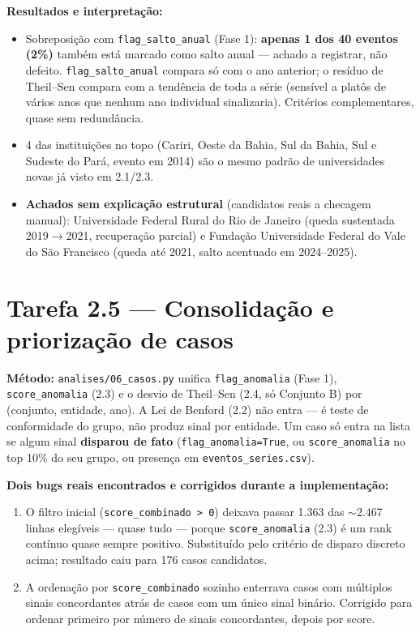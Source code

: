 \documentclass[11pt,a4paper]{article}
\begin{document}
\textbf{Resultados e interpretação:}

\begin{itemize}
    \item Sobreposição com \texttt{flag\_salto\_anual} (Fase 1):
    \textbf{apenas 1 dos 40 eventos (2\%)} também está marcado como salto
    anual --- achado a registrar, não defeito. \texttt{flag\_salto\_anual}
    compara só com o ano anterior; o resíduo de Theil--Sen compara com a
    tendência de toda a série (sensível a platôs de vários anos que nenhum
    ano individual sinalizaria). Critérios complementares, quase sem
    redundância.
    \item 4 das instituições no topo (Cariri, Oeste da Bahia, Sul da
    Bahia, Sul e Sudeste do Pará, evento em 2014) são o mesmo padrão de
    universidades novas já visto em 2.1/2.3.
    \item \textbf{Achados sem explicação estrutural} (candidatos reais a
    checagem manual): Universidade Federal Rural do Rio de Janeiro (queda
    sustentada 2019$\to$2021, recuperação parcial) e Fundação
    Universidade Federal do Vale do São Francisco (queda até 2021, salto
    acentuado em 2024--2025).
\end{itemize}

\section{Tarefa 2.5 --- Consolidação e priorização de casos}

\textbf{Método:} \texttt{analises/06\_casos.py} unifica
\texttt{flag\_anomalia} (Fase 1), \texttt{score\_anomalia} (2.3) e o
desvio de Theil--Sen (2.4, só Conjunto B) por (conjunto, entidade, ano). A
Lei de Benford (2.2) não entra --- é teste de conformidade do grupo, não
produz sinal por entidade. Um caso só entra na lista se algum sinal
\textbf{disparou de fato} (\texttt{flag\_anomalia=True}, ou
\texttt{score\_anomalia} no top 10\% do seu grupo, ou presença em
\texttt{eventos\_series.csv}).

\textbf{Dois bugs reais encontrados e corrigidos durante a
implementação:}
\begin{enumerate}
    \item O filtro inicial (\texttt{score\_combinado > 0}) deixava passar
    1.363 das ${\sim}$2.467 linhas elegíveis --- quase tudo --- porque
    \texttt{score\_anomalia} (2.3) é um rank contínuo quase sempre
    positivo. Substituído pelo critério de disparo discreto acima;
    resultado caiu para 176 casos candidatos.
    \item A ordenação por \texttt{score\_combinado} sozinho enterrava
    casos com múltiplos sinais concordantes atrás de casos com um único
    sinal binário. Corrigido para ordenar primeiro por número de sinais
    concordantes, depois por score.
\end{enumerate}
\end{document}
